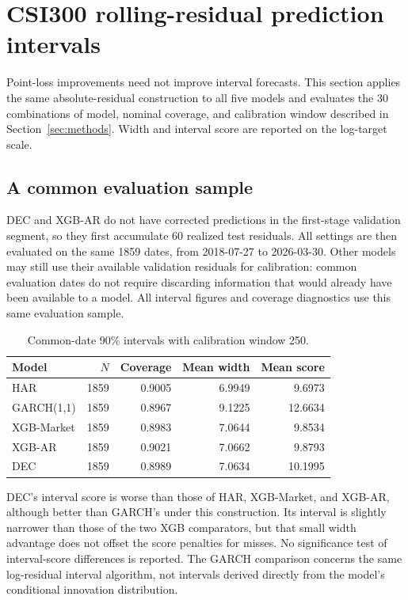 \section{CSI300 rolling-residual prediction intervals}
\label{sec:intervals}
Point-loss improvements need not improve interval forecasts. This section applies the same absolute-residual construction to all five models and evaluates the 30 combinations of model, nominal coverage, and calibration window described in Section~\ref{sec:methods}. Width and interval score are reported on the log-target scale.

\subsection{A common evaluation sample}
DEC and XGB-AR do not have corrected predictions in the first-stage validation segment, so they first accumulate 60 realized test residuals. All settings are then evaluated on the same 1859 dates, from 2018-07-27 to 2026-03-30. Other models may still use their available validation residuals for calibration: common evaluation dates do not require discarding information that would already have been available to a model. All interval figures and coverage diagnostics use this same evaluation sample.

\begin{table}[htbp]\centering
\caption{Common-date 90\% intervals with calibration window 250.}
\label{tab:interval_main}\label{tab:common_intervals}
\begin{tabular}{lrrrr}\toprule Model & $N$ & Coverage & Mean width & Mean score\\\midrule
HAR & 1859 & 0.9005 & 6.9949 & 9.6973\\
GARCH(1,1) & 1859 & 0.8967 & 9.1225 & 12.6634\\
XGB-Market & 1859 & 0.8983 & 7.0644 & 9.8534\\
XGB-AR & 1859 & 0.9021 & 7.0662 & 9.8793\\
DEC & 1859 & 0.8989 & 7.0634 & 10.1995\\\bottomrule
\end{tabular}
\end{table}

DEC's interval score is worse than those of HAR, XGB-Market, and XGB-AR, although better than GARCH's under this construction. Its interval is slightly narrower than those of the two XGB comparators, but that small width advantage does not offset the score penalties for misses. No significance test of interval-score differences is reported. The GARCH comparison concerns the same log-residual interval algorithm, not intervals derived directly from the model's conditional innovation distribution.

